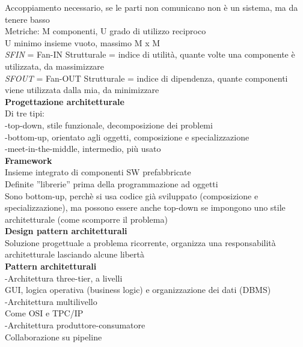 \documentclass{article}
\begin{document}
		Accoppiamento necessario, se le parti non comunicano non è un sistema, ma da tenere basso\\
		Metriche: M componenti, U grado di utilizzo reciproco\\
		U minimo insieme vuoto, massimo M x M\\
		\textit{SFIN} = Fan-IN Strutturale = indice di utilità, quante volte una componente è utilizzata, da massimizzare\\
		\textit{SFOUT} = Fan-OUT Strutturale = indice di dipendenza, quante componenti viene utilizzata dalla mia, da minimizzare\\
		
		\textbf{Progettazione architetturale}\\
		Di tre tipi:\\
		-top-down, stile funzionale, decomposizione dei problemi\\
		-bottom-up, orientato agli oggetti, composizione e specializzazione\\
		-meet-in-the-middle, intermedio, più usato\\
		
		\textbf{Framework}\\
		Insieme integrato di componenti SW prefabbricate\\
		Definite ''librerie'' prima della programmazione ad oggetti\\
		Sono bottom-up, perchè si usa codice già sviluppato (composizione e specializzazione), ma possono essere anche top-down se impongono uno stile architetturale (come scomporre il problema)\\
		
		\textbf{Design pattern architetturali}\\
		Soluzione progettuale a problema ricorrente, organizza una responsabilità architetturale lasciando alcune libertà\\
		
		\textbf{Pattern architetturali}\\
		-Architettura three-tier, a livelli\\
		GUI, logica operativa (business logic) e organizzazione dei dati (DBMS)\\
		-Architettura multilivello\\
		Come OSI e TPC/IP\\
		-Architettura produttore-consumatore\\
		Collaborazione su pipeline\\
		
\end{document}
